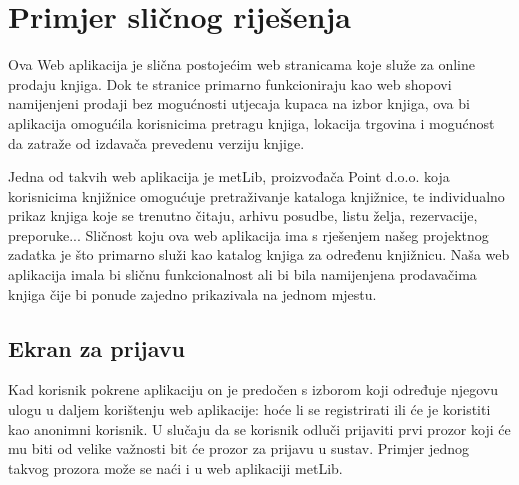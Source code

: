 	\section{Primjer sličnog riješenja}	
		
	Ova Web aplikacija je slična postojećim web stranicama koje služe za online prodaju knjiga. Dok te stranice primarno funkcioniraju kao web shopovi namijenjeni prodaji bez mogućnosti utjecaja kupaca na izbor knjiga, ova bi aplikacija omogućila korisnicima pretragu knjiga, lokacija trgovina i mogućnost da zatraže od izdavača prevedenu verziju knjige.
	
	Jedna od takvih web aplikacija je metLib, proizvođača Point d.o.o. koja korisnicima knjižnice omogućuje pretraživanje kataloga knjižnice, te individualno prikaz knjiga koje se trenutno čitaju, arhivu posudbe, listu želja, rezervacije, preporuke... Sličnost koju ova web aplikacija ima s rješenjem našeg projektnog zadatka je što primarno služi kao katalog knjiga za određenu knjižnicu. Naša web aplikacija imala bi sličnu funkcionalnost ali bi bila namijenjena prodavačima knjiga čije bi ponude zajedno prikazivala na jednom mjestu.
	
	\subsection{Ekran za prijavu}
	
	Kad korisnik pokrene aplikaciju on je predočen s izborom koji određuje njegovu ulogu u daljem korištenju web aplikacije: hoće li se registrirati ili će je koristiti kao anonimni korisnik. U slučaju da se korisnik odluči prijaviti prvi prozor koji će mu biti od velike važnosti bit će prozor za prijavu u sustav. Primjer jednog takvog prozora može se naći i u web aplikaciji metLib.
		
